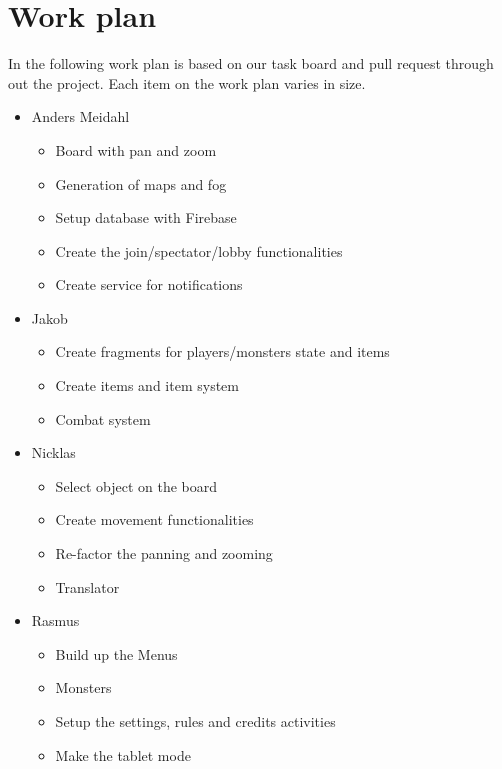 \pagestyle{Uni}

\chapter{Work plan}
In the following work plan is based on our task board and pull request through out the project. Each item on the work plan varies in size.

\begin{itemize}
	\item Anders Meidahl
	\begin{itemize}
		\item Board with pan and zoom 
		\item Generation of maps and fog
		\item Setup database with Firebase
		\item Create the join/spectator/lobby functionalities
		\item Create service for notifications
	\end{itemize}
	
	\item Jakob
	\begin{itemize}
		\item Create fragments for players/monsters state and items
		\item Create items and item system
		\item Combat system
	\end{itemize}
	\item Nicklas
	\begin{itemize}
		\item Select object on the board
		\item Create movement functionalities
		\item Re-factor the panning and zooming
		\item Translator
	\end{itemize}
	\item Rasmus
	\begin{itemize}
		\item Build up the Menus
		\item Monsters
		\item Setup the settings, rules and credits activities
		\item Make the tablet mode
	\end{itemize}
\end{itemize}